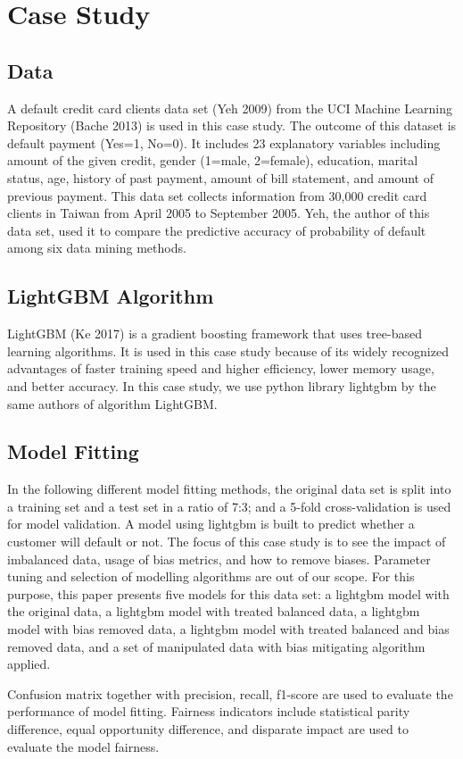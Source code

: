 \documentclass{article}
\begin{document}
\section{Case Study}
\subsection{Data}
A default credit card clients data set (Yeh 2009) from the UCI Machine Learning Repository (Bache 2013) is used in this case study. The outcome of this dataset is default payment (Yes=1, No=0). It includes 23 explanatory variables including amount of the given credit, gender (1=male, 2=female), education, marital status, age, history of past payment, amount of bill statement, and amount of previous payment. This data set collects information from 30,000 credit card clients in Taiwan from April 2005 to September 2005.
Yeh, the author of this data set, used it to compare the predictive accuracy of probability of default among six data mining methods.
\subsection{LightGBM Algorithm}
LightGBM (Ke 2017) is a gradient boosting framework that uses tree-based learning algorithms. It is used in this case study because of its widely recognized advantages of faster training speed and higher efficiency, lower memory usage, and better accuracy. In this case study, we use python library lightgbm by the same authors of algorithm LightGBM. 
\subsection{Model Fitting}
In the following different model fitting methods, the original data set is split into a training set and a test set in a ratio of 7:3; and a 5-fold cross-validation is used for model validation. A model using lightgbm is built to predict whether a customer will default or not. The focus of this case study is to see the impact of imbalanced data, usage of bias metrics, and how to remove biases. Parameter tuning and selection of modelling algorithms are out of our scope. For this purpose, this paper presents five models for this data set:  a lightgbm model with the original data, a lightgbm model with treated balanced data, a lightgbm model with bias removed data, a lightgbm model with treated balanced and bias removed data, and a set of manipulated data with bias mitigating algorithm applied. 

Confusion matrix together with precision, recall, f1-score are used to evaluate the performance of model fitting. Fairness indicators include statistical parity difference, equal opportunity difference, and disparate impact are used to evaluate the model fairness.
\end{document}
